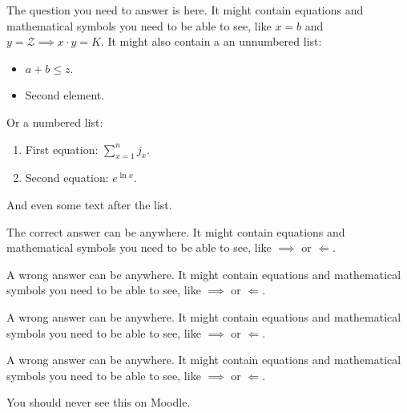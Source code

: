 \question[\mypoints] The question you need to answer is here.
It might contain equations and mathematical symbols you need to be able to see, like $x = b$ and $y=\mathcal{Z} \implies x\cdot y = K$.
It might also contain a an unnumbered list:
\begin{itemize}
  \item $a + b \leq z$.
  \item Second element.
\end{itemize}
Or a numbered list:
\begin{enumerate}
  \item First equation: $\sum_{x=1}^n j_x$.
  \item Second equation: $e^{\ln x}$.
\end{enumerate}
And even some text after the list.

\begin{mychoices}
  \CorrectChoice The correct answer can be anywhere.
  It might contain equations and mathematical symbols you need to be able to see, like $\implies$ or $\Longleftarrow$.
  
  \choice A wrong answer can be anywhere.
  It might contain equations and mathematical symbols you need to be able to see, like $\implies$ or $\Longleftarrow$.
  
  \choice A wrong answer can be anywhere.
  It might contain equations and mathematical symbols you need to be able to see, like $\implies$ or $\Longleftarrow$.
  
  \choice A wrong answer can be anywhere.
  It might contain equations and mathematical symbols you need to be able to see, like $\implies$ or $\Longleftarrow$.
\end{mychoices}

\begin{solutionorbox}
  You should never see this on Moodle.
\end{solutionorbox}
